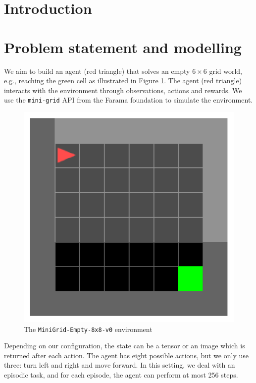 \newcommand{\bydef}{\overset{\scriptscriptstyle\Delta}{=}}
\newcommand{\EE}{\mathbb{E}}
\newcommand{\PP}{\mathbb{P}}

\begin{abstract}

\end{abstract}

\section{Introduction}

\section{Problem statement and modelling}
We aim to build an agent (red triangle) that solves an empty  $6\times6$ grid world, e.g., reaching the green cell as illustrated in Figure \ref{fig:mini-grid}. The agent (red triangle) interacts with the environment through observations, actions and rewards. We use the \texttt{mini-grid} API from the Farama foundation to simulate the environment.
\begin{figure}[H]
	\centering
	\includegraphics[width=0.9\linewidth]{figures/grid_world.pdf}
	\caption{The \texttt{MiniGrid-Empty-8x8-v0} environment}
	\label{fig:mini-grid}
\end{figure}

Depending on our configuration, the state can be a tensor or an image which is returned after each action. The agent has eight possible actions, but we only use three: turn left and right and move forward. In this setting, we deal with an episodic task, and for each episode, the agent can perform at most 256 steps.

